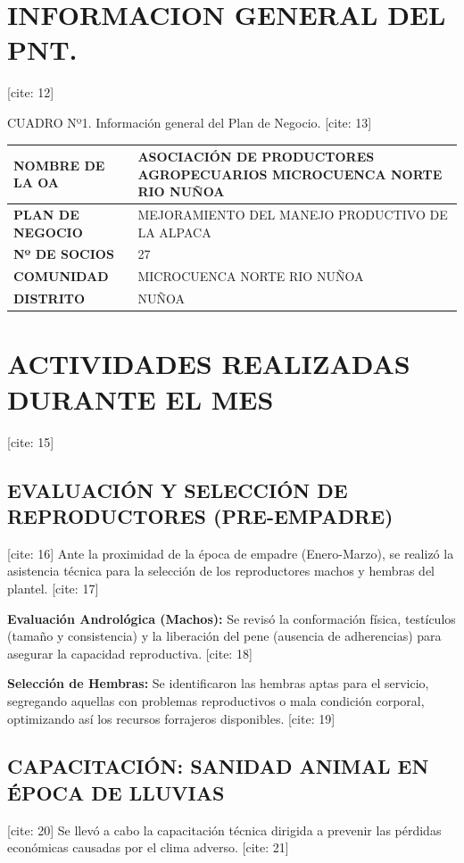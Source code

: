 \documentclass[11pt,a4paper]{article}
\begin{document}
\section{INFORMACION GENERAL DEL PNT.} [cite: 12]

CUADRO Nº1. Información general del Plan de Negocio. [cite: 13]

\begin{table}[h!]
    \centering
    \small
    \begin{tabularx}{\textwidth}{|l|X|}
        \hline
        \bfseries NOMBRE DE LA OA & ASOCIACIÓN DE PRODUCTORES AGROPECUARIOS MICROCUENCA NORTE RIO NUÑOA \\ \hline [cite: 14]
        \bfseries PLAN DE NEGOCIO & MEJORAMIENTO DEL MANEJO PRODUCTIVO DE LA ALPACA \\ \hline [cite: 14]
        \bfseries Nº DE SOCIOS & 27 \\ \hline [cite: 14]
        \bfseries COMUNIDAD & MICROCUENCA NORTE RIO NUÑOA \\ \hline [cite: 14]
        \bfseries DISTRITO & NUÑOA \\ \hline [cite: 14]
    \end{tabularx}
\end{table}

\section{ACTIVIDADES REALIZADAS DURANTE EL MES} [cite: 15]

\subsection{EVALUACIÓN Y SELECCIÓN DE REPRODUCTORES (PRE-EMPADRE)} [cite: 16]
Ante la proximidad de la época de empadre (Enero-Marzo), se realizó la asistencia técnica para la selección de los reproductores machos y hembras del plantel. [cite: 17]

\textbf{Evaluación Andrológica (Machos):} Se revisó la conformación física, testículos (tamaño y consistencia) y la liberación del pene (ausencia de adherencias) para asegurar la capacidad reproductiva. [cite: 18]

\textbf{Selección de Hembras:} Se identificaron las hembras aptas para el servicio, segregando aquellas con problemas reproductivos o mala condición corporal, optimizando así los recursos forrajeros disponibles. [cite: 19]

\subsection{CAPACITACIÓN: SANIDAD ANIMAL EN ÉPOCA DE LLUVIAS} [cite: 20]
Se llevó a cabo la capacitación técnica dirigida a prevenir las pérdidas económicas causadas por el clima adverso. [cite: 21]
\end{document}
